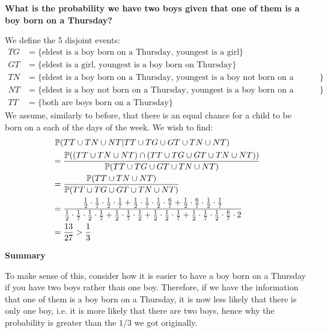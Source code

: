 \documentclass[../main.tex]{subfiles}
\begin{document}
\begin{example}
  \textbf{What is the probability we have two boys given that one of them is a boy born on a Thursday?}\par
  We define the 5 disjoint events:
  \begin{align*}
    TG &= \{\text{eldest is a boy born on a Thursday, youngest is a girl}\} \\
    GT &= \{\text{eldest is a girl, youngest is a boy born on Thursday}\} \\
    TN &= \{\text{eldest is a boy born on a Thursday, youngest is a boy not born on a Thursday}\} \\
    NT &= \{\text{eldest is a boy not born on a Thursday, youngest is a boy born on a Thursday}\} \\
    TT &= \{\text{both are boys born on a Thursday}\}
  \end{align*}
  We assume, similarly to before, that there is an equal chance for a child to be born on a each of the days of the week.
  We wish to find:
  \begin{align*}
    &\ \P(TT \cup TN \cup NT \vert TT \cup TG \cup GT \cup TN \cup NT) \\
                                   &=\frac{\P((TT \cup TN \cup NT) \cap (TT \cup TG \cup GT \cup TN \cup NT))}{\P(TT \cup TG \cup GT \cup TN \cup NT)} \\
                                   &= \frac{\P(TT \cup TN \cup NT)}{\P(TT \cup TG \cup GT \cup TN \cup NT)} \\
                                   &= \frac{\frac{1}{2} \cdot \frac{1}{7}\cdot \frac{1}{2} \cdot \frac{1}{7} + \frac{1}{2} \cdot \frac{1}{7} \cdot \frac{1}{2} \cdot \frac{6}{7} + \frac{1}{2} \cdot \frac{6}{7} \cdot \frac{1}{2} \cdot \frac{1}{7}}{\frac{1}{2} \cdot \frac{1}{7} \cdot \frac{1}{2} \cdot \frac{1}{7} + \frac{1}{2} \cdot \frac{1}{7} \cdot \frac{1}{2} + \frac{1}{2} \cdot \frac{1}{2} \cdot \frac{1}{7} + \frac{1}{2} \cdot \frac{1}{7} \cdot \frac{1}{2} \cdot \frac{6}{7} \cdot 2} \\
                                   &= \frac{13}{27} > \frac{1}{3}
  \end{align*}

  \textbf{Summary}\par
  To make sense of this, consider how it is easier to have a boy born on a Thursday if you have two boys rather than one boy.
  Therefore, if we have the information that one of them is a boy born on a Thursday, it is now less likely that there is only one boy, i.e. it is more likely that there are two boys, hence why the probability is greater than the $1/3$ we got originally.
\end{example}
\end{document}
